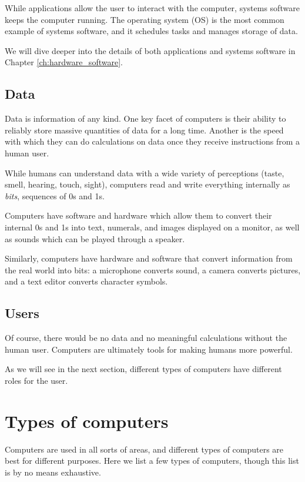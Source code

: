 While applications allow the user to interact with the computer, systems software keeps the computer running. The operating system (OS) is the most common example of systems software, and it schedules tasks and manages storage of data.

We will dive deeper into the details of both applications and systems software in Chapter \ref{ch:hardware_software}.

\subsection{Data}
Data is information of any kind. One key facet of computers is their ability to reliably store massive quantities of data for a long time. Another is the speed with which they can do calculations on data once they receive instructions from a human user.

While humans can understand data with a wide variety of perceptions (taste,
smell, hearing, touch, sight), computers read and write everything internally as
\textit{bits}, sequences of 0s and 1s.

Computers have software and hardware which allow them to convert their internal 0s and 1s into text, numerals, and images displayed on a monitor, as well as sounds which can be played through a speaker.

Similarly, computers have hardware and software that convert information from
the real world into bits: a microphone converts sound, a camera converts pictures, and a text editor converts character symbols.

\subsection{Users}

Of course, there would be no data and no meaningful calculations without the human user. Computers are ultimately tools for making humans more powerful.

As we will see in the next section, different types of computers have different roles for the user.

\section{Types of computers}

Computers are used in all sorts of areas, and different types of computers are best for different purposes. Here we list a few types of computers, though this list is by no means exhaustive.

